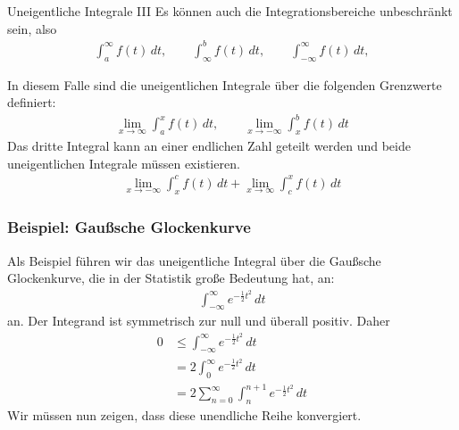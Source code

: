 \begin{frame}{Uneigentliche Integrale III}
    Es können auch die Integrationsbereiche unbeschränkt sein, also
    \begin{gather*}
        \int_a^\infty f(t)\,dt,
        \qquad \int_\infty^b f(t)\,dt,
        \qquad\int_{-\infty}^\infty f(t)\,dt,
    \end{gather*}

    In diesem Falle sind die uneigentlichen Integrale über die folgenden Grenzwerte definiert:
    \begin{gather*}
       \lim_{x\to\infty}\int_a^x f(t)\,dt,
       \qquad \lim_{x\to-\infty}\int_x^b f(t)\,dt
     \end{gather*}
     \pause
    Das dritte Integral kann an einer endlichen Zahl geteilt werden und beide uneigentlichen Integrale müssen existieren.
    \begin{gather*}
        \lim_{x\to-\infty}\int_{x}^c f(t)\,dt
        + \lim_{x\to\infty}\int_{c}^x f(t)\,dt
    \end{gather*}
\end{frame}

\begin{frame}
    \frametitle<presentation>{Beispiel: Gaußsche Glockenkurve}
    Als Beispiel führen wir das uneigentliche Integral über die Gaußsche Glockenkurve, die in der Statistik große Bedeutung hat, an:
    \begin{gather*}
        \int_{-\infty}^\infty e^{-\frac12 t^2}\,dt
    \end{gather*}
    an. Der Integrand ist symmetrisch zur null und überall positiv. Daher
    \begin{align*}
        0
        & \le \int_{-\infty}^\infty e^{-\frac12 t^2}\,dt
        \\
        & = 2\int_{0}^\infty e^{-\frac12 t^2}\,dt
        \\
        & = 2 \sum_{n=0}^\infty \int_{n}^{n+1} e^{-\frac12 t^2}\,dt
    \end{align*}
    Wir müssen nun zeigen, dass diese unendliche Reihe konvergiert.
\end{frame}

